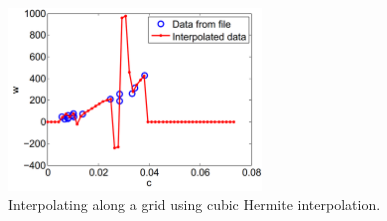 \documentclass[11pt]{article}
\begin{document}
\begin{figure} [h]
\centering
\includegraphics[width=0.6\textwidth]{interpolator}
\caption{\label{fig:interpolator} Interpolating along a grid using
  cubic Hermite interpolation.}
\end{figure}


\end{document}
